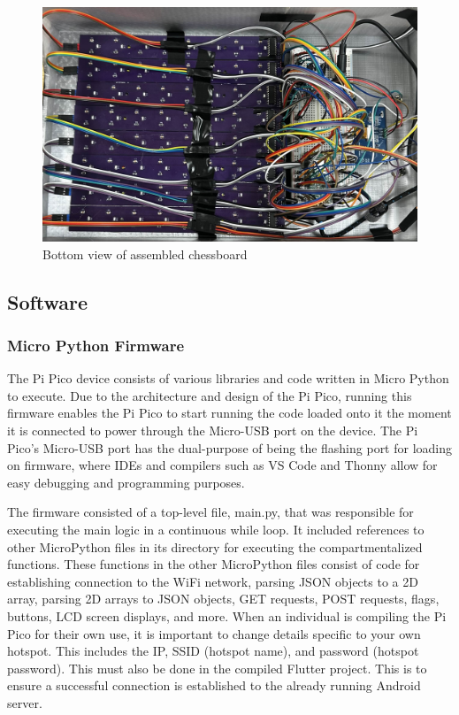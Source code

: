 \documentclass[11pt,journal]{IEEEtran}
\begin{document}
\begin{figure}[ht]
  \includegraphics[width=\linewidth]{boardBottom.jpg}
  \caption{Bottom view of assembled chessboard}
  \label{boardbottom}
\end{figure}
\subsection{Software}
\subsubsection{Micro Python Firmware}
The Pi Pico device consists of various libraries and code written in Micro Python to execute. Due to the architecture and design of the Pi Pico, running this firmware enables the Pi Pico to start running the code loaded onto it the moment it is connected to power through the Micro-USB port on the device. The Pi Pico's Micro-USB port has the dual-purpose of being the flashing port for loading on firmware, where IDEs and compilers such as VS Code and Thonny allow for easy debugging and programming purposes.

The firmware consisted of a top-level file, main.py, that was responsible for executing the main logic in a continuous while loop. It included references to other MicroPython files in its directory for executing the compartmentalized functions. These functions in the other MicroPython files consist of code for establishing connection to the WiFi network, parsing JSON objects to a 2D array, parsing 2D arrays to JSON objects, GET requests, POST requests, flags, buttons, LCD screen displays, and more.
When an individual is compiling the Pi Pico for their own use, it is important to change details specific to your own hotspot. This includes the IP, SSID (hotspot name), and password (hotspot password). This must also be done in the compiled Flutter project. This is to ensure a successful connection is established to the already running Android server. 
\end{document}
